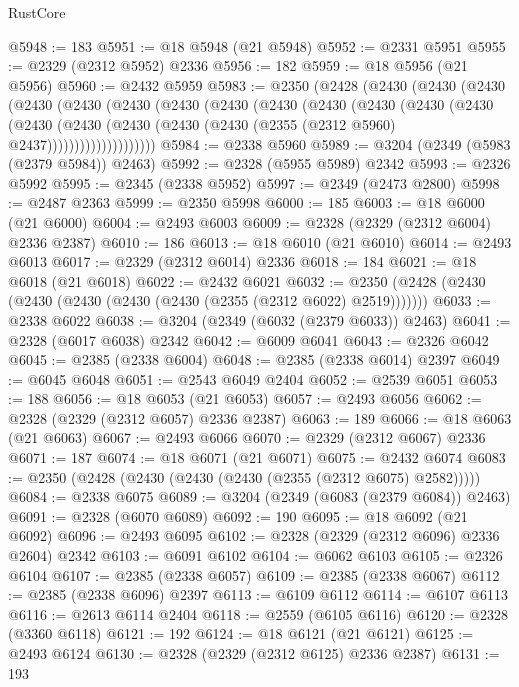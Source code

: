 \begin{lexlean}{RustCore}
\begin{coremodule}
@5948 := 183
@5951 := @18 @5948 (@21 @5948)
@5952 := @2331 @5951
@5955 := @2329 (@2312 @5952) @2336
@5956 := 182
@5959 := @18 @5956 (@21 @5956)
@5960 := @2432 @5959
@5983 := @2350
    (@2428
      (@2430
        (@2430
          (@2430
            (@2430
              (@2430
                (@2430
                  (@2430
                    (@2430
                      (@2430
                        (@2430
                          (@2430
                            (@2430
                              (@2430
                                (@2430
                                  (@2430
                                    (@2430
                                      (@2430 (@2430 (@2355 (@2312 @5960) @2437))))))))))))))))))))
@5984 := @2338 @5960
@5989 := @3204 (@2349 (@5983 (@2379 @5984)) @2463)
@5992 := @2328 (@5955 @5989) @2342
@5993 := @2326 @5992
@5995 := @2345 (@2338 @5952)
@5997 := @2349 (@2473 @2800)
@5998 := @2487 @2363
@5999 := @2350 @5998
@6000 := 185
@6003 := @18 @6000 (@21 @6000)
@6004 := @2493 @6003
@6009 := @2328 (@2329 (@2312 @6004) @2336 @2387)
@6010 := 186
@6013 := @18 @6010 (@21 @6010)
@6014 := @2493 @6013
@6017 := @2329 (@2312 @6014) @2336
@6018 := 184
@6021 := @18 @6018 (@21 @6018)
@6022 := @2432 @6021
@6032 := @2350 (@2428 (@2430 (@2430 (@2430 (@2430 (@2430 (@2355 (@2312 @6022) @2519)))))))
@6033 := @2338 @6022
@6038 := @3204 (@2349 (@6032 (@2379 @6033)) @2463)
@6041 := @2328 (@6017 @6038) @2342
@6042 := @6009 @6041
@6043 := @2326 @6042
@6045 := @2385 (@2338 @6004)
@6048 := @2385 (@2338 @6014) @2397
@6049 := @6045 @6048
@6051 := @2543 @6049 @2404
@6052 := @2539 @6051
@6053 := 188
@6056 := @18 @6053 (@21 @6053)
@6057 := @2493 @6056
@6062 := @2328 (@2329 (@2312 @6057) @2336 @2387)
@6063 := 189
@6066 := @18 @6063 (@21 @6063)
@6067 := @2493 @6066
@6070 := @2329 (@2312 @6067) @2336
@6071 := 187
@6074 := @18 @6071 (@21 @6071)
@6075 := @2432 @6074
@6083 := @2350 (@2428 (@2430 (@2430 (@2430 (@2355 (@2312 @6075) @2582)))))
@6084 := @2338 @6075
@6089 := @3204 (@2349 (@6083 (@2379 @6084)) @2463)
@6091 := @2328 (@6070 @6089)
@6092 := 190
@6095 := @18 @6092 (@21 @6092)
@6096 := @2493 @6095
@6102 := @2328 (@2329 (@2312 @6096) @2336 @2604) @2342
@6103 := @6091 @6102
@6104 := @6062 @6103
@6105 := @2326 @6104
@6107 := @2385 (@2338 @6057)
@6109 := @2385 (@2338 @6067)
@6112 := @2385 (@2338 @6096) @2397
@6113 := @6109 @6112
@6114 := @6107 @6113
@6116 := @2613 @6114 @2404
@6118 := @2559 (@6105 @6116)
@6120 := @2328 (@3360 @6118)
@6121 := 192
@6124 := @18 @6121 (@21 @6121)
@6125 := @2493 @6124
@6130 := @2328 (@2329 (@2312 @6125) @2336 @2387)
@6131 := 193

\end{coremodule}
\end{lexlean}
